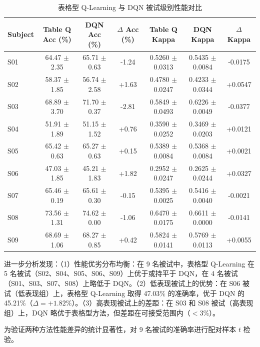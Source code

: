 \begin{table}[H]
\centering
\caption{表格型 Q-Learning 与 DQN 被试级别性能对比}
\label{tab:subject_comparison}
\small
\begin{tabular}{lcccccc}
\hline
\textbf{Subject} & \textbf{Table Q Acc (\%)} & \textbf{DQN Acc (\%)} & \textbf{$\Delta$ Acc (\%)} & \textbf{Table Q Kappa} & \textbf{DQN Kappa} & \textbf{$\Delta$ Kappa} \\
\hline
S01 & 64.47 $\pm$ 2.35 & 65.71 $\pm$ 0.63 & -1.24 & 0.5260 $\pm$ 0.0313 & 0.5435 $\pm$ 0.0084 & -0.0175 \\
S02 & 58.37 $\pm$ 1.85 & 56.74 $\pm$ 2.58 & +1.63 & 0.4780 $\pm$ 0.0247 & 0.4233 $\pm$ 0.0344 & +0.0547 \\
S03 & 68.89 $\pm$ 3.70 & 71.70 $\pm$ 0.37 & -2.81 & 0.5849 $\pm$ 0.0493 & 0.6226 $\pm$ 0.0049 & -0.0377 \\
S04 & 51.91 $\pm$ 1.89 & 51.15 $\pm$ 1.52 & +0.76 & 0.3590 $\pm$ 0.0252 & 0.3469 $\pm$ 0.0203 & +0.0121 \\
S05 & 65.42 $\pm$ 0.63 & 65.27 $\pm$ 0.63 & +0.15 & 0.5389 $\pm$ 0.0084 & 0.5368 $\pm$ 0.0084 & +0.0021 \\
S06 & 47.03 $\pm$ 1.85 & 45.21 $\pm$ 1.83 & +1.82 & 0.2952 $\pm$ 0.0247 & 0.2625 $\pm$ 0.0244 & +0.0327 \\
S07 & 65.46 $\pm$ 0.19 & 65.61 $\pm$ 0.30 & -0.15 & 0.5395 $\pm$ 0.0025 & 0.5416 $\pm$ 0.0040 & -0.0021 \\
S08 & 73.56 $\pm$ 1.31 & 74.62 $\pm$ 0.00 & -1.06 & 0.6470 $\pm$ 0.0175 & 0.6611 $\pm$ 0.0000 & -0.0141 \\
S09 & 68.69 $\pm$ 1.06 & 68.27 $\pm$ 0.85 & +0.42 & 0.5824 $\pm$ 0.0141 & 0.5769 $\pm$ 0.0113 & +0.0055 \\
\hline
\end{tabular}
\end{table}

进一步分析发现：（1）性能优劣分布均衡：在 9 名被试中，表格型 Q-Learning 在 5 名被试（S02、S04、S05、S06、S09）上优于或持平于 DQN，在 4 名被试（S01、S03、S07、S08）上略低于 DQN。（2）低表现被试上的优势：在 S06 被试（低表现组）上，表格型 Q-Learning 取得 47.03\% 的准确率，优于 DQN 的 45.21\%（$\Delta = +1.82\%$）。（3）高表现被试上的差距：在 S03 和 S08 被试（高表现组）上，DQN 略优于表格型方法，但差距在可接受范围内（$< 3\%$）。

\label{subsec:statistical_test}

为验证两种方法性能差异的统计显著性，对 9 名被试的准确率进行配对样本 $t$ 检验\cite{field2013discovering}。

